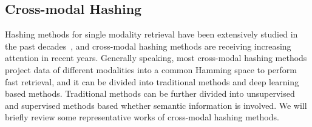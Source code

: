 \documentclass[journal]{IEEEtran}
\begin{document}
\subsection{Cross-modal Hashing}
Hashing methods for single modality retrieval have been extensively studied in the past decades~\cite{lsh_vldb,agh_icml,imagehashsurvey,llh_cvpr,ninh_cvpr,sdh_cvpr,sh_nips,ssh_cvpr}, and cross-modal hashing methods are receiving increasing attention in recent years. Generally speaking, most cross-modal hashing methods project data of different modalities into a common Hamming space to perform fast retrieval, and it can be divided into traditional methods and deep learning based methods. Traditional methods can be further divided into unsupervised and supervised methods based whether semantic information is involved. We will briefly review some representative works of cross-modal hashing methods.
\end{document}
